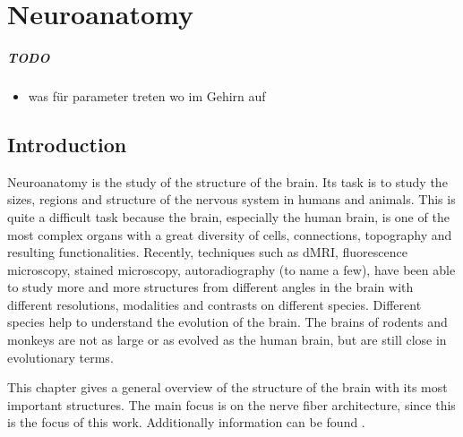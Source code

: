 \setcounter{chapter}{1}
\chapter{Neuroanatomy}
\label{chap:neuro}
%
%
%
\paragraph{TODO}
\begin{itemize}
    \item was für parameter treten wo im Gehirn auf
\end{itemize}
%
%
\section{Introduction}
%
Neuroanatomy is the study of the structure of the brain.
Its task is to study the sizes, regions and structure of the nervous system in humans and animals.
This is quite a difficult task because the brain, especially the human brain, is one of the most complex organs with a great diversity of cells, connections, topography and resulting functionalities.
Recently, techniques such as \ac{dMRI}, fluorescence microscopy, stained microscopy, autoradiography (to name a few), have been able to study more and more structures from different angles in the brain with different resolutions, modalities and contrasts on different species.
Different species help to understand the evolution of the brain. The brains of rodents and monkeys are not as large or as evolved as the human brain, but are still close in evolutionary terms.
\par
%
This chapter gives a general overview of the structure of the brain with its most important structures.
The main focus is on the nerve fiber architecture, since this is the focus of this work.
Additionally information can be found \eg{} \dummy{}.
%
%
%
